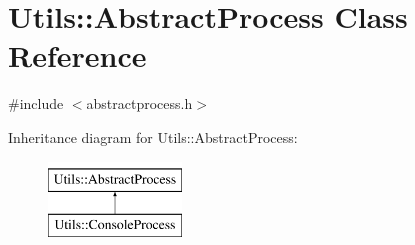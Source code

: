 \hypertarget{class_utils_1_1_abstract_process}{\section{Utils\-:\-:Abstract\-Process Class Reference}
\label{class_utils_1_1_abstract_process}
}


{\ttfamily \#include $<$abstractprocess.\-h$>$}

Inheritance diagram for Utils\-:\-:Abstract\-Process\-:\begin{figure}[H]
\begin{center}
\leavevmode
\includegraphics[height=2.000000cm]{class_utils_1_1_abstract_process}
\end{center}
\end{figure}
